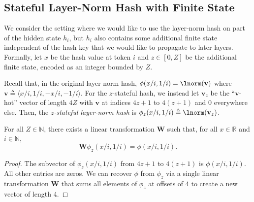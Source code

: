 \subsection{Stateful Layer-Norm Hash with Finite State} \label{sec:stateful-lnorm-hash}

We consider the setting where we would like to use the layer-norm hash on part of the hidden state $h_i$, but $h_i$ also contains some additional finite state independent of the hash key that we would like to propagate to later layers. Formally, let $x$ be the hash value at token $i$ and $z \in [0, Z]$ be the additional finite state, encoded as an integer bounded by $Z$.

\begin{definition}
    Recall that, in the original layer-norm hash, $\phi(x/i, 1/i) = \lnorm(\mathbf v)$ where $\mathbf v \triangleq \langle x/i, 1/i, -x/i, -1/i \rangle$. For the $z$-stateful hash, we instead let $\mathbf v_z$ be the ``$\mathbf v$-hot'' vector of length $4Z$ with $\mathbf v$ at indices $4z + 1$ to $4(z + 1)$ and $0$ everywhere else. Then, the \emph{$z$-stateful layer-norm hash} is $\phi_z(x/i, 1/i) \triangleq \lnorm (\mathbf v_z)$.
\end{definition}


\begin{lemma} \label{lem:stateful-hash}
    For all $Z \in \mathbb N$, there exists a linear transformation $\mathbf W$ such that,
    for all $x \in \mathbb R$ and $i \in \mathbb N$,
    \begin{equation*}
        \mathbf W \phi_z(x/i, 1/i) = \phi(x/i, 1/i) .
    \end{equation*}
\end{lemma}

\begin{proof}
    The subvector of $\phi_z(x/i, 1/i)$ from $4z + 1$ to $4(z + 1)$ is $\phi(x/i, 1/i)$. All other entries are zeros.
    We can recover $\phi$ from $\phi_z$ via a single linear transformation $\mathbf W$ that sums all elements of $\phi_z$ at offsets of $4$ to create a new vector of length $4$. 
\end{proof}


